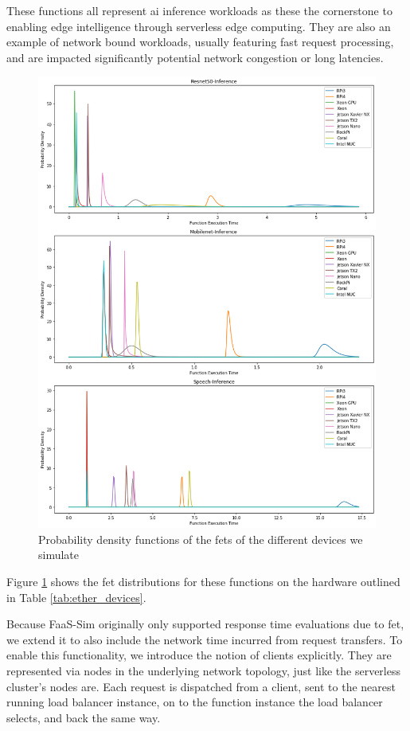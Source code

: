 \documentclass[draft,final]{vutinfth} %
\begin{document}
These functions all represent \gls{ai} inference workloads as these the cornerstone to enabling edge intelligence\cite{rauschEdgeIntelligenceConvergence2019} through serverless edge computing.
They are also an example of network bound workloads, usually featuring fast request processing, and are impacted significantly potential network congestion or long latencies.
\begin{figure}
    \centering
    \includegraphics[width=\linewidth]{graphics/graphs/devices_fets.png}
    \caption{Probability density functions of the \glspl{fet} of the different devices we simulate}
    \label{fig:devices_fets}
\end{figure}

Figure \ref{fig:devices_fets}
shows the \gls{fet} distributions for these functions on the hardware outlined in Table \ref{tab:ether_devices}.

Because FaaS-Sim originally only supported response time evaluations due to \gls{fet}, we extend it to also include the network time incurred from request transfers.
To enable this functionality, we introduce the notion of clients explicitly.
They are represented via nodes in the underlying network topology, just like the serverless cluster's nodes are.
Each request is dispatched from a client, sent to the nearest running load balancer instance, on to the function instance the load balancer selects, and back the same way.
\end{document}
